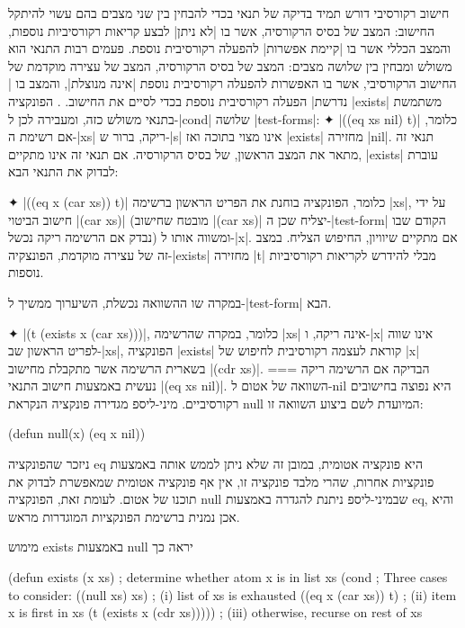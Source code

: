 חישוב רקורסיבי דורש תמיד בדיקה של תנאי בכדי להבחין בין שני מצבים בהם עשוי
להיתקל החישוב: המצב של בסיס הרקורסיה, אשר בו \ע|לא ניתן| לבצע קריאות רקורסיביות
נוספות, והמצב הכללי אשר בו \ע|קיימת אפשרות| להפעלה רקורסיבית נוספת. פעמים רבות
התנאי הוא משולש ומבחין בין שלושה מצבים: המצב של בסיס הרקורסיה, המצב של עצירה
מוקדמת של החישוב הרקורסיבי, אשר בו האפשרות להפעלה רקורסיבית נוספת \ע|אינה
מנוצלת|, והמצב בו \ע|נדרשת| הפעלה רקורסיבית נוספת בכדי לסיים את החישוב.
.
הפונקציה \T|exists| משתמשת בתנאי משולש כזה, ומעבירה לכן ל-\T|cond| שלושה
\E|test-forms|:
✦ \T|((eq xs nil) t)| כלומר, אם רשימת ה-\T|xs| ריקה, ברור ש-\T|s| אינו מצוי
בתוכה ואז \T|exists| מחזירה \T|nil|. תנאי זה מתאר את המצב הראשון, של בסיס
הרקורסיה. אם תנאי זה אינו מתקיים, \T|exists| עוברת לבדוק את התנאי הבא:

✦ \T|((eq x (car xs)) t)| כלומר, הפונקציה בוחנת את הפריט הראשון ברשימה \T|xs|,
על ידי חישוב הביטוי \T|(car xs)| (מובטח שחישוב \T|(car xs)| יצליח שכן
ה-\E|test-form| הקודם שבו נבדק אם הרשימה ריקה נכשל) ומשווה אותו ל-\T|x|. אם
מתקיים שיוויון, החיפוש הצליח. במצב זה של עצירה מוקדמת, הפונצקיה-\T|exists|
מחזירה \T|t| מבלי להידרש לקריאות רקורסיביות נוספות.

במקרה שו ההשוואה נכשלת, השיערוך ממשיך ל-\E|test-form| הבא.

✦ \T|(t (exists x (car xs)))|, כלומר, במקרה שהרשימה \T|xs| אינה ריקה, ו-\T|x|
אינו שווה לפריט הראשון שב-\T|xs|, הפונקציה \T|exists| קוראת לעצמה רקורסיבית
לחיפוש של \T|x| בשארית הרשימה אשר מתקבלת מחישוב \T|(cdr xs)|.
===
הבדיקה אם הרשימה ריקה נעשית באמצעות חישוב התנאי \T|(eq xs nil)|. השוואה של אטום
ל-nil היא נפוצה בחישובים רקורסיביים. מיני-ליספ מגדירה פונקציה הנקראת null
המיועדת לשם ביצוע השוואה זו:
\begin{LIBRARY}
(defun null(x) (eq x nil))
\end{LIBRARY}

ניזכר שהפונקציה eq היא פונקציה אטומית, במובן זה שלא ניתן לממש אותה באמצעות
פונקציות אחרות, שהרי מלבד פונקציה זו, אין אף פונקציה אטומית שמאפשרת לבדוק את
תוכנו של אטום. לעומת זאת, הפונקציה null שבמיני-ליספ ניתנת להגדרה
באמצעות eq, והיא אכן נמנית ברשימת הפונקציות המוגדרות מראש.

מימוש exists באמצעות null יראה כך
\begin{KERNEL}
(defun exists (x xs) ; determine whether atom x is in list xs
  (cond ; Three cases to consider:
    ((null xs) xs) ; (i) list of xs is exhausted
    ((eq x (car xs)) t) ; (ii) item x is first in xs
    (t (exists x (cdr xs))))) ; (iii) otherwise, recurse on rest of xs
\end{KERNEL}

